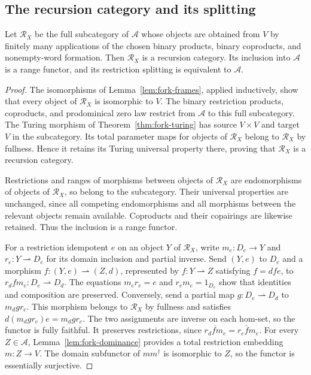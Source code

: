 \subsection{The recursion category and its splitting}

\begin{proposition}\label{prop:fork-recursion}
Let $\mathscr R_X$ be the full subcategory of $\mathcal A$
whose objects are obtained from $V$ by finitely many applications
of the chosen binary products, binary coproducts, and nonempty-word formation.
Then $\mathscr R_X$ is a recursion category. Its inclusion
into $\mathcal A$ is a range functor, and its restriction
splitting is equivalent to $\mathcal A$.
\end{proposition}
\begin{proof}
The isomorphisms of Lemma~\ref{lem:fork-frames}, applied inductively,
show that every object of $\mathscr R_X$ is isomorphic to $V$.
The binary restriction products, coproducts, and prodominical
zero law restrict from $\mathcal A$ to this full subcategory.
The Turing morphism of Theorem~\ref{thm:fork-turing} has
source $V\times V$ and target $V$ in the subcategory.
Its total parameter maps for objects of $\mathscr R_X$ belong
to $\mathscr R_X$ by fullness. Hence it retains its Turing
universal property there, proving that $\mathscr R_X$ is a
recursion category.

Restrictions and ranges of morphisms between objects of $\mathscr R_X$
are endomorphisms of objects of $\mathscr R_X$, so belong to the subcategory.
Their universal properties are unchanged, since all competing
endomorphisms and all morphisms between the relevant objects remain
available. Coproducts and their copairings are likewise retained.
Thus the inclusion is a range functor.

For a restriction idempotent $e$ on an object $Y$ of $\mathscr R_X$,
write $m_e:D_e\to Y$ and $r_e:Y\rightharpoonup D_e$ for its
domain inclusion and partial inverse. Send $(Y,e)$ to $D_e$
and a morphism $f:(Y,e)\rightharpoonup(Z,d)$, represented by
$f:Y\rightharpoonup Z$ satisfying $f=dfe$, to
$r_d f m_e:D_e\rightharpoonup D_d$.
The equations $m_er_e=e$ and $r_em_e=1_{D_e}$ show that
identities and composition are preserved. Conversely, send a
partial map $g:D_e\rightharpoonup D_d$ to $m_d g r_e$.
This morphism belongs to $\mathscr R_X$ by fullness and satisfies
$d(m_d g r_e)e=m_d g r_e$. The two assignments are inverse on
each hom-set, so the functor is fully faithful.
It preserves restrictions, since
$\overline{r_d f m_e}=r_e\bar f m_e$.
For every $Z\in\mathcal A$, Lemma~\ref{lem:fork-dominance}
provides a total restriction embedding $m:Z\to V$.
The domain subfunctor of $mm^\dagger$ is isomorphic to $Z$,
so the functor is essentially surjective.
\end{proof}

